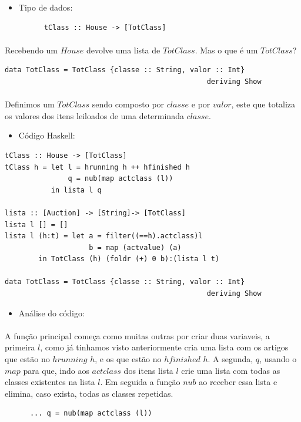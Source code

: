 \documentclass[a4paper]{article}
\begin{document}
\begin{enumerate}
\begin{itemize}
\item {Tipo de dados:}
\begin{verbatim}
      tClass :: House -> [TotClass]
\end{verbatim}
\end{itemize}
\paragraph{}Recebendo um $House$ devolve uma lista de $TotClass$. Mas o que é um $TotClass$?
\begin{verbatim}
data TotClass = TotClass {classe :: String, valor :: Int} 
                                                deriving Show
\end{verbatim}
\paragraph{}Definimos um $TotClass$ sendo composto por $classe$ e por $valor$, este que totaliza os valores dos itens leiloados de uma determinada $classe$.
\begin{itemize}
\item {Código Haskell:}
\end{itemize}
\begin{verbatim}
tClass :: House -> [TotClass]
tClass h = let l = hrunning h ++ hfinished h	
               q = nub(map actclass (l))
           in lista l q

lista :: [Auction] -> [String]-> [TotClass]
lista l [] = [] 
lista l (h:t) = let a = filter((==h).actclass)l
                    b = map (actvalue) (a)
		in TotClass (h) (foldr (+) 0 b):(lista l t)

data TotClass = TotClass {classe :: String, valor :: Int} 
                                                deriving Show
\end{verbatim}
\begin{itemize}
\item{Análise do código:}
\end{itemize}
\paragraph{}A função principal começa como muitas outras por criar duas variaveis, a primeira $l$, como já tinhamos visto anteriormente cria uma lista com os artigos que estão no $hrunning$ $h$, e os que estão no $hfinished$ $h$. A segunda, $q$, usando o $map$ para que, indo aos $actclass$ dos itens lista $l$ crie uma lista com todas as classes existentes na lista $l$. Em seguida a função $nub$ ao receber essa lista e elimina, caso exista, todas as classes repetidas.
\begin{verbatim}
      ... q = nub(map actclass (l))
\end{verbatim}
\newpage

\end{enumerate}
\end{document}
